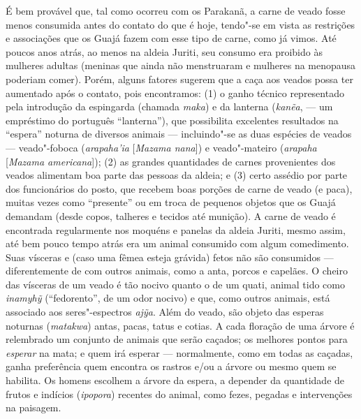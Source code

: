 É bem provável que, tal como ocorreu com os Parakanã, a carne de veado
fosse menos consumida antes do contato do que é hoje, tendo"-se em vista
as restrições e associações que os Guajá fazem com esse tipo de carne,
como já vimos. Até poucos anos atrás, ao menos na aldeia Juriti, seu
consumo era proibido às mulheres adultas (meninas que ainda não
menstruaram e mulheres na menopausa poderiam comer). Porém, alguns
fatores sugerem que a caça aos veados possa ter aumentado após o
contato, pois encontramos: (1) o ganho técnico representado pela
introdução da espingarda (chamada \emph{maka}) e da lanterna
(\emph{kanẽa}, --- um empréstimo do português ``lanterna''), que possibilita
excelentes resultados na ``espera'' noturna de diversos animais ---
incluindo"-se as duas espécies de veados --- veado"-foboca
(\emph{arapaha'ia} {[}\emph{Mazama nana}{]}) e veado"-mateiro
(\emph{arapaha} {[}\emph{Mazama americana}{]}); (2) as grandes
quantidades de carnes provenientes dos veados alimentam boa parte das
pessoas da aldeia; e (3) certo assédio por parte dos funcionários do
posto, que recebem boas porções de carne de veado (e paca), muitas vezes
como ``presente'' ou em troca de pequenos objetos que os Guajá demandam
(desde copos, talheres e tecidos até munição). A carne de veado é
encontrada regularmente nos moquéns e panelas da aldeia Juriti, mesmo
assim, até bem pouco tempo atrás era um animal consumido com algum
comedimento. Suas vísceras e (caso uma fêmea esteja grávida) fetos não
são consumidos --- diferentemente de com outros animais, como a anta,
porcos e capelães. O cheiro das vísceras de um veado é tão nocivo quanto
o de um quati, animal tido como \emph{inamyhỹ} (``fedorento'', de um odor
nocivo) e que, como outros animais, está associado aos seres"-espectros
\emph{ajỹa}. Além do veado, são objeto das esperas noturnas
(\emph{matakwa}) antas, pacas, tatus e cotias. A cada floração de uma
árvore é relembrado um conjunto de animais que serão caçados; os
melhores pontos para \emph{esperar} na mata; e quem irá esperar ---
normalmente, como em todas as caçadas, ganha preferência quem encontra
os rastros e/ou a árvore ou mesmo quem se habilita. Os homens escolhem a
árvore da espera, a depender da quantidade de frutos e indícios
(\emph{ipopora}) recentes do animal, como fezes, pegadas e intervenções
na paisagem.

